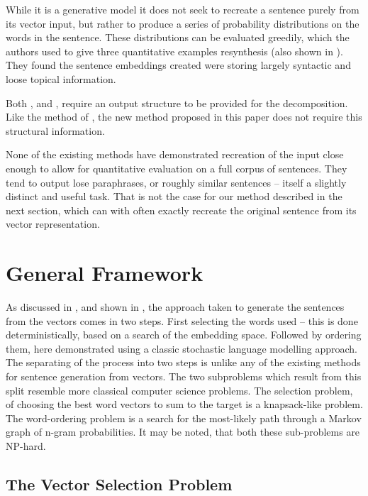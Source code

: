 \documentclass[11pt]{article}
\theoremstyle{plain}
\theoremstyle{definition}
\begin{document}
While it is a generative model it does not seek to recreate a sentence purely from its vector input, but rather to produce a series of probability distributions on the words in the sentence. These distributions can be evaluated greedily, which the authors used to give three quantitative examples resynthesis (also shown in ). They found the sentence embeddings created were storing largely syntactic and loose topical information. 


Both \textcite{Dinu2014CompositionalGeneration}, and  \textcite{iyyer2014generating}, require an output structure to be provided for the decomposition. Like the method of  \textcite{Bowman2015SmoothGeneration}, the new method proposed in this paper does not require this structural information.

None of the existing methods have demonstrated recreation of the input close enough to allow for quantitative evaluation on a full corpus of sentences. They tend to output lose paraphrases, or roughly similar sentences -- itself a slightly distinct and useful task.  That is not the case for our method described in the next section, which can with often exactly recreate the original sentence from its vector representation.

\section{General Framework}\label{framework}
As discussed in , and shown in , the approach taken to generate the sentences from the vectors comes in two steps. First selecting the words used -- this is done deterministically, based on a search of the embedding space. Followed by ordering them, here demonstrated using a classic stochastic language modelling approach. The separating of the process into two steps is unlike any of the existing methods for sentence generation from vectors. The two subproblems which result from this split resemble more classical computer science problems. The selection problem, of choosing the best word vectors to sum to the target is a knapsack-like problem. The word-ordering problem is a search for the most-likely path through a Markov graph of n-gram probabilities. It may be noted, that both these sub-problems are NP-hard.

\subsection{The Vector Selection Problem}
\end{document}
